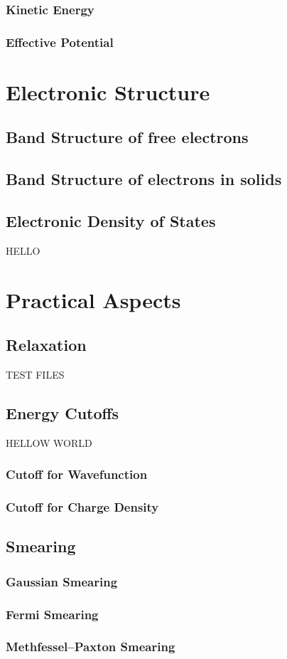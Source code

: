         \subsubsection{Kinetic Energy}
        \subsubsection{Effective Potential}
\section{Electronic Structure}
    \subsection{Band Structure of free electrons}
    \subsection{Band Structure of electrons in solids}
    \subsection{Electronic Density of States}

    HELLO
\section{Practical Aspects}
    \subsection{Relaxation}
    TEST FILES
    \subsection{Energy Cutoffs}
    HELLOW WORLD
        \subsubsection{Cutoff for Wavefunction}
        \subsubsection{Cutoff for Charge Density}
    \subsection{Smearing}
        \subsubsection{Gaussian Smearing}
        \subsubsection{Fermi Smearing}
        \subsubsection{Methfessel–Paxton Smearing}





